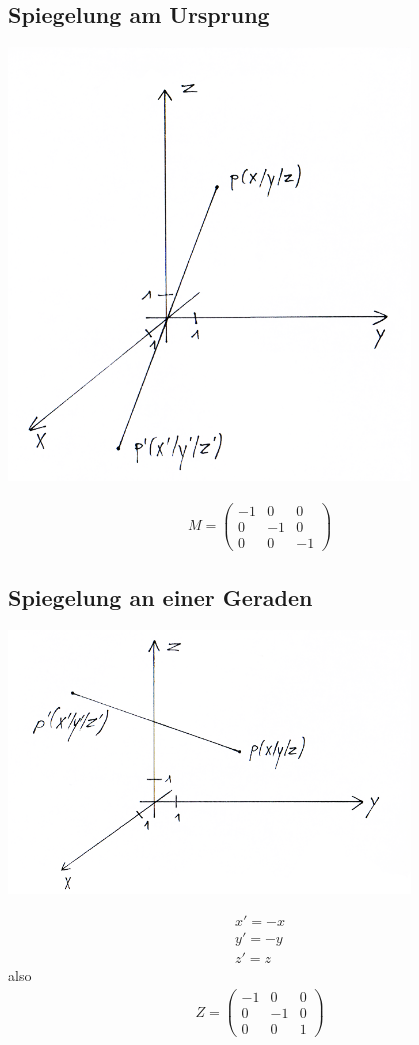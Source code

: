 \documentclass[a4paper,10pt]{report}
\begin{document}
\subsection{Spiegelung am Ursprung}
\begin{center}
	 \includegraphics[width=0.8\textwidth]{imgs/R3spiegelungUrsprung.png}
\end{center}
\begin{eqnarray*}
M=\begin{pmatrix}-1&0&0\\0&-1&0\\0&0&-1\end{pmatrix}
\end{eqnarray*}
\newpage
\subsection{Spiegelung an einer Geraden}
\begin{center}
	 \includegraphics[width=0.8\textwidth]{imgs/R3spiegelungZAchse.png}
\end{center}
\begin{eqnarray*}
x' = -x\\
y'= -y\\
z'=z
\end{eqnarray*}
also
\begin{eqnarray*}
Z=\begin{pmatrix}-1&0&0\\0&-1&0\\0&0&1\end{pmatrix}
\end{eqnarray*}
\newpage
\end{document}
